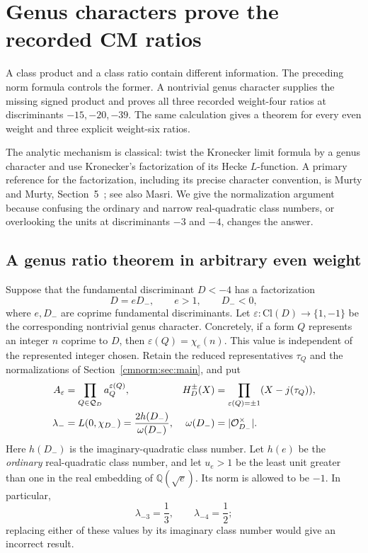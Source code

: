 
\section{Genus characters prove the recorded CM ratios}
\label{cmgenus:sec:main}

A class product and a class ratio contain different information.
The preceding norm formula controls the former. A nontrivial genus
character supplies the missing signed product and proves all three
recorded weight-four ratios at discriminants $-15,-20,-39$.
The same calculation gives a theorem for every even weight and three
explicit weight-six ratios.

The analytic mechanism is classical: twist the Kronecker limit formula
by a genus character and use Kronecker's factorization of its Hecke
$L$-function. A primary reference for the factorization, including its
precise character convention, is Murty and Murty,
Section~5~\cite{cmgenus:MurtyMurty}; see also Masri\cite[eqs.~(1.3)--(1.5)]{cmgenus:Masri}. We give the normalization argument
because confusing the ordinary and narrow real-quadratic class numbers,
or overlooking the units at discriminants $-3$ and $-4$, changes the
answer.

\subsection{A genus ratio theorem in arbitrary even weight}

Suppose that the fundamental discriminant $D<-4$ has a factorization
\[
 D=eD_-,\qquad e>1,\qquad D_-<0,
\]
where $e,D_-$ are coprime fundamental discriminants. Let
$\varepsilon:\mathrm{Cl}(D)\longrightarrow\{1,-1\}$ be the
corresponding nontrivial genus character. Concretely, if a form $Q$
represents an integer $n$ coprime to $D$, then
$\varepsilon(Q)=\chi_e(n)$. This value is independent of the represented
integer chosen. Retain the reduced representatives $\tau_Q$ and the
normalizations of Section~\ref{cmnorm:sec:main}, and put
\begin{align}
 A_\varepsilon&=\prod_{Q\in\mathcal Q_D}a_Q^{\varepsilon(Q)},&
 H_D^\pm(X)&=\prod_{\varepsilon(Q)=\pm1}(X-j(\tau_Q)),\label{cmgenus:eq:data}\\
 \lambda_-&=L(0,\chi_{D_-})
      =\frac{2h(D_-)}{\omega(D_-)},&
 \omega(D_-)&=|\mathcal O_{D_-}^{\times}|.\notag
\end{align}
Here $h(D_-)$ is the imaginary-quadratic class number. Let $h(e)$ be
the \emph{ordinary} real-quadratic class number, and let $u_e>1$ be the
least unit greater than one in the real embedding of
$\mathbb Q(\sqrt e)$. Its norm is allowed to be $-1$.
In particular,
\[
 \lambda_{-3}=\frac13,\qquad \lambda_{-4}=\frac12;
\]
replacing either of these values by its imaginary class number would
give an incorrect result.

